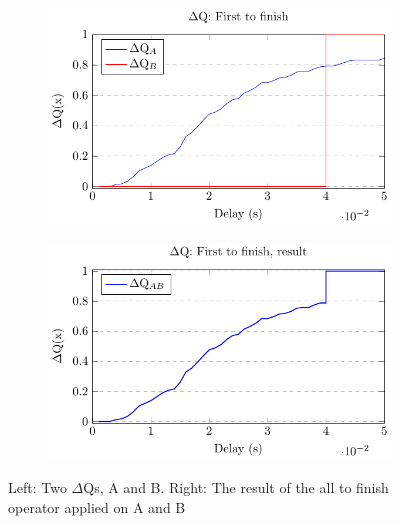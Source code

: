        \begin{figure}[H]
            \centering
            \begin{subfigure}{.5\textwidth}
                \centering
                \includegraphics[scale = 0.7]{tikz/ftf_1.pdf}
                \label{fig:ftf1}
            \end{subfigure}%
            \begin{subfigure}{.5\textwidth}
                \centering
                \includegraphics[scale = 0.7]{tikz/ftf_2.pdf}
                \label{fig:ftf2}
            \end{subfigure}
            \caption{Left: Two $\Delta$Qs, A and B. Right: The result of the all to finish operator applied on A and B}%
            \label{fig:ftf}
            \end{figure}


